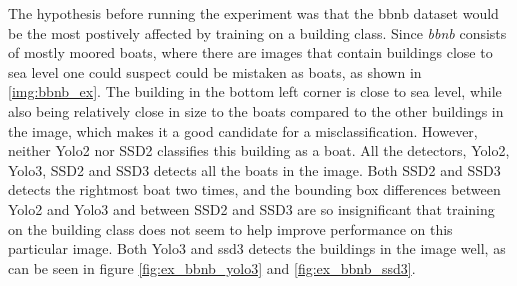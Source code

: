 The hypothesis before running the experiment was that the bbnb dataset would be the most postively affected by training on a building class. Since \textit{bbnb} consists of mostly moored boats, where there are images that contain buildings close to sea level one could suspect could be mistaken as boats, as shown in \ref{img:bbnb_ex}. The building in the bottom left corner is close to sea level, while also being relatively close in size to the boats compared to the other buildings in the image, which makes it a good candidate for a misclassification. However, neither Yolo2 nor SSD2 classifies this building as a boat. All the detectors, Yolo2, Yolo3, SSD2 and SSD3 detects all the boats in the image. Both SSD2 and SSD3 detects the rightmost boat two times, and the bounding box differences between Yolo2 and Yolo3 and between SSD2 and SSD3 are so insignificant that training on the building class does not seem to help improve performance on this particular image. Both Yolo3 and ssd3 detects the buildings in the image well, as can be seen in figure \ref{fig:ex_bbnb_yolo3} and \ref{fig:ex_bbnb_ssd3}.


